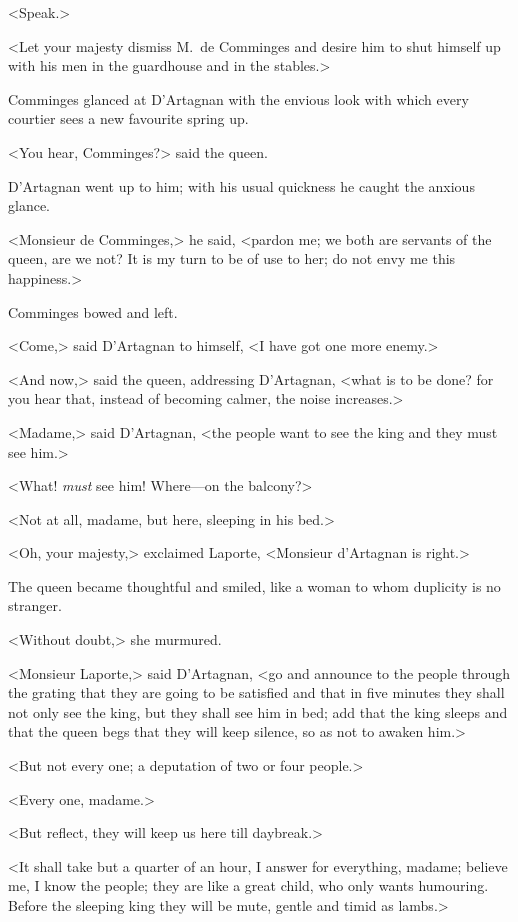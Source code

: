 <Speak.>

<Let your majesty dismiss M.~de Comminges and desire him to shut himself up with his men in the guardhouse and in the stables.>

Comminges glanced at D'Artagnan with the envious look with which every courtier sees a new favourite spring up.

<You hear, Comminges?> said the queen.

D'Artagnan went up to him; with his usual quickness he caught the anxious glance.

<Monsieur de Comminges,> he said, <pardon me; we both are servants of the queen, are we not? It is my turn to be of use to her; do not envy me this happiness.>

Comminges bowed and left.

<Come,> said D'Artagnan to himself, <I have got one more enemy.>

<And now,> said the queen, addressing D'Artagnan, <what is to be done? for you hear that, instead of becoming calmer, the noise increases.>

<Madame,> said D'Artagnan, <the people want to see the king and they must see him.>

<What! \emph{must} see him! Where—on the balcony?>

<Not at all, madame, but here, sleeping in his bed.>

<Oh, your majesty,> exclaimed Laporte, <Monsieur d'Artagnan is right.>

The queen became thoughtful and smiled, like a woman to whom duplicity is no stranger.

<Without doubt,> she murmured.

<Monsieur Laporte,> said D'Artagnan, <go and announce to the people through the grating that they are going to be satisfied and that in five minutes they shall not only see the king, but they shall see him in bed; add that the king sleeps and that the queen begs that they will keep silence, so as not to awaken him.>

<But not every one; a deputation of two or four people.>

<Every one, madame.>

<But reflect, they will keep us here till daybreak.>

<It shall take but a quarter of an hour, I answer for everything, madame; believe me, I know the people; they are like a great child, who only wants humouring. Before the sleeping king they will be mute, gentle and timid as lambs.>

